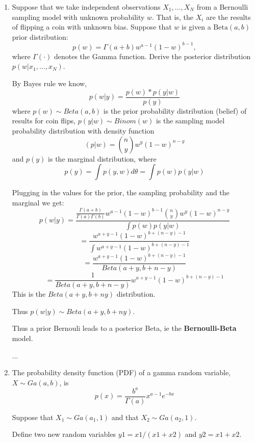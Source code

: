 \documentclass{homework}
\begin{document}
\begin{enumerate}[label=(\Alph*)]
\item Suppose that we take independent observations $X_1, \dots , X_N$ from a Bernoulli sampling model with unknown probability $w$. That is, the $X_i$ are the results of flipping a coin with unknown bias. Suppose that $w$ is given a $\text{Beta}(a,b)$ prior distribution:
$$p(w) = \Gamma(a + b) w^{a-1} (1 - w)^{b-1},$$
where $\Gamma(\cdot)$ denotes the Gamma function. Derive the posterior distribution $p(w | x_1,\dots,x_N)$.


By Bayes rule we know, $$p(w | y) = \frac{p(w) * p(y | w )}{p(y)}$$ where $p(w)  \sim Beta(a,b)$ is the prior probability distribution (belief) of results for coin flips, $p(y | w) \sim Binom(w) $ is the sampling model probability distribution with density function $$(p | w) = {n\choose y}w^{y}(1 - w)^{n - y}$$
 and $p(y)$ is the marginal distribution, where $$p(y) = \int p(y,w)  d\theta = \int p(w)p(y|w)$$
 
 Plugging in the values for the prior, the sampling probability and the marginal we get: 
 $$p(w | y) = \frac{ \frac{ \Gamma(a+b)}{ \Gamma(a) \Gamma(b) } w^{a-1} (1 - w )^{b-1} {n\choose y}w^{y}(1 - w)^{n - y} }{ \int p(w)p(y|w)}$$
$$ = \frac{ w^{a + y -1}( 1 - w )^{b + (n - y ) -1 }}{ \int w^{a + y -1}(1 - w)^{b + (n - y ) - 1}}$$
$$ = \frac{ w^{a + y -1}( 1 - w )^{b + (n - y ) -1 }}{ Beta(a + y, b + n - y) }$$
$$ = \frac{1}{ Beta(a + y, b + n - y) } w^{a + y -1}( 1 - w )^{b + (n - y ) -1 }$$
This is the $Beta(a + y, b + n   y)$ distribution. \par
Thus $p(w|y) \sim Beta(a+y,b+n y)$.\par
Thus a prior Bernouli leads to a posterior Beta, ie the \textbf{Bernoulli-Beta} model.
\par ...


\item The probability density function (PDF) of a gamma random variable, $X \sim Ga(a, b)$, is 
$$ p(x) = \frac{ b^{a}}{\Gamma(a)}x^{a-1}e^{-bx}$$


Suppose that $X_{1} \sim Ga(a_1, 1)$ and that $X_{2} \sim Ga(a_2, 1)$.  \par \noindent Define two new random variables $y1 = x1/(x1 + x2)$ and $y2 = x1 + x2$. 


\end{enumerate}
\end{document}
